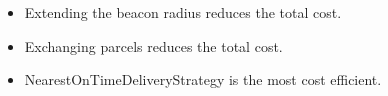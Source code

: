\documentclass[../main.tex]{subfiles}
\begin{document}
\begin{itemize}
	\item Extending the beacon radius reduces the total cost.
	\item Exchanging parcels reduces the total cost.
	\item NearestOnTimeDeliveryStrategy is the most cost efficient. 
\end{itemize}
\end{document}
